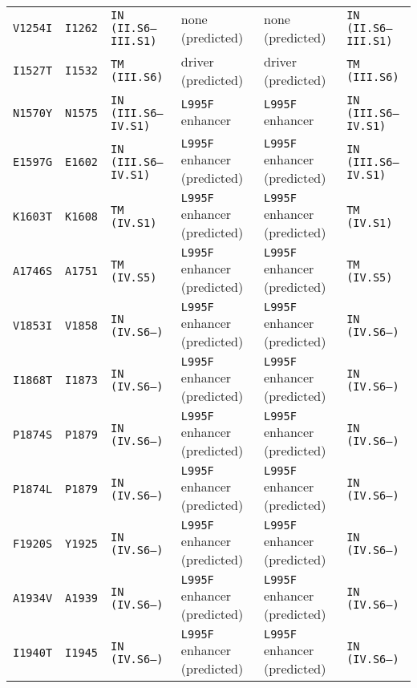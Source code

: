 \begin{tabular}{llllll}
\texttt{V1254I} & \texttt{I1262} & \texttt{IN (II.S6--III.S1)} & none (predicted) & none (predicted) & \texttt{IN (II.S6--III.S1)} \\

\texttt{I1527T} & \texttt{I1532} & \texttt{TM (III.S6)} & driver (predicted) & driver (predicted) & \texttt{TM (III.S6)} \\

\texttt{N1570Y} & \texttt{N1575} & \texttt{IN (III.S6--IV.S1)} & \texttt{L995F} enhancer & \texttt{L995F} enhancer & \texttt{IN (III.S6--IV.S1)} \\

\texttt{E1597G} & \texttt{E1602} & \texttt{IN (III.S6--IV.S1)} & \texttt{L995F} enhancer (predicted) & \texttt{L995F} enhancer (predicted) & \texttt{IN (III.S6--IV.S1)} \\

\texttt{K1603T} & \texttt{K1608} & \texttt{TM (IV.S1)} & \texttt{L995F} enhancer (predicted) & \texttt{L995F} enhancer (predicted) & \texttt{TM (IV.S1)} \\

\texttt{A1746S} & \texttt{A1751} & \texttt{TM (IV.S5)} & \texttt{L995F} enhancer (predicted) & \texttt{L995F} enhancer (predicted) & \texttt{TM (IV.S5)} \\

\texttt{V1853I} & \texttt{V1858} & \texttt{IN (IV.S6--)} & \texttt{L995F} enhancer (predicted) & \texttt{L995F} enhancer (predicted) & \texttt{IN (IV.S6--)} \\

\texttt{I1868T} & \texttt{I1873} & \texttt{IN (IV.S6--)} & \texttt{L995F} enhancer (predicted) & \texttt{L995F} enhancer (predicted) & \texttt{IN (IV.S6--)} \\

\texttt{P1874S} & \texttt{P1879} & \texttt{IN (IV.S6--)} & \texttt{L995F} enhancer (predicted) & \texttt{L995F} enhancer (predicted) & \texttt{IN (IV.S6--)} \\

\texttt{P1874L} & \texttt{P1879} & \texttt{IN (IV.S6--)} & \texttt{L995F} enhancer (predicted) & \texttt{L995F} enhancer (predicted) & \texttt{IN (IV.S6--)} \\

\texttt{F1920S} & \texttt{Y1925} & \texttt{IN (IV.S6--)} & \texttt{L995F} enhancer (predicted) & \texttt{L995F} enhancer (predicted) & \texttt{IN (IV.S6--)} \\

\texttt{A1934V} & \texttt{A1939} & \texttt{IN (IV.S6--)} & \texttt{L995F} enhancer (predicted) & \texttt{L995F} enhancer (predicted) & \texttt{IN (IV.S6--)} \\

\texttt{I1940T} & \texttt{I1945} & \texttt{IN (IV.S6--)} & \texttt{L995F} enhancer (predicted) & \texttt{L995F} enhancer (predicted) & \texttt{IN (IV.S6--)} \\

\bottomrule
\end{tabular}
